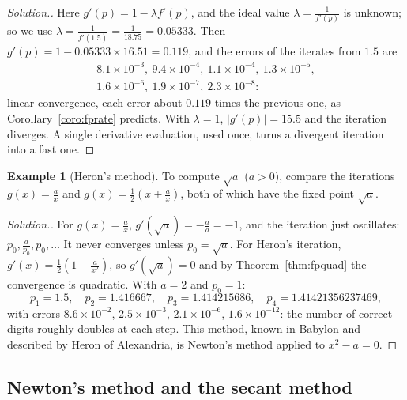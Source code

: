 \documentclass[11pt,a4paper]{article}
\numberwithin{equation}{section}
\theoremstyle{definition}
\newtheorem{exa}[thm]{Example}
\newenvironment{solution}
  {\renewcommand{\qedsymbol}{}\begin{proof}[\textit{Solution}.]}
  {\end{proof}}
\begin{document}
\begin{solution}
Here $g'(p) = 1-\lambda f'(p)$, and the ideal value $\lambda = \frac1{f'(p)}$ is unknown; so we use $\lambda = \frac{1}{f'(1.5)} = \frac1{18.75} =
0.05333$. Then $g'(p) = 1-0.05333\times16.51 = 0.119$, and the errors of the iterates from $1.5$ are
\begin{gather*}
8.1\times10^{-3},\ 9.4\times10^{-4},\ 1.1\times10^{-4},\ 1.3\times10^{-5},\\
1.6\times10^{-6},\ 1.9\times10^{-7},\ 2.3\times10^{-8}:
\end{gather*}
linear convergence, each error about $0.119$ times the previous one, as Corollary~\ref{coro:fprate} predicts. With $\lambda = 1$, $|g'(p)|
= 15.5$ and the iteration diverges. A single derivative evaluation, used once, turns a divergent iteration into a fast one.
\end{solution}

\begin{exa}[Heron's method]
\label{exa:heron}
To compute $\sqrt a$ ($a>0$), compare the iterations $g(x) = \frac ax$ and $g(x) = \frac12\left(x+\frac ax\right)$, both of which have the fixed
point $\sqrt a$.
\end{exa}

\begin{solution}
For $g(x) = \frac ax$, $g'(\sqrt a) = -\frac{a}{a} = -1$, and the iteration just oscillates: $p_0, \frac a{p_0}, p_0, \dots$ It never
converges unless $p_0 = \sqrt a$. For Heron's iteration, $g'(x) = \frac12\left(1-\frac a{x^2}\right)$, so $g'(\sqrt a) = 0$ and by
Theorem~\ref{thm:fpquad} the convergence is quadratic. With $a = 2$ and $p_0 = 1$:
$$p_1 = 1.5,\quad p_2 = 1.416667,\quad p_3 = 1.414215686,\quad p_4 = 1.41421356237469,$$
with errors $8.6\times10^{-2}$, $2.5\times10^{-3}$, $2.1\times10^{-6}$, $1.6\times10^{-12}$: the number of correct digits roughly doubles
at each step. This method, known in Babylon and described by Heron of Alexandria, is Newton's method applied to $x^2-a = 0$.
\end{solution}


\subsection{Newton's method and the secant method}
\label{sec:newton}
\end{document}

